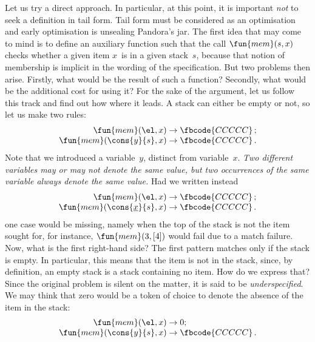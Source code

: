 Let us try a direct approach. In particular, at this point, it is
important \emph{not} to seek a definition in tail form. Tail form must
be considered as an optimisation and early optimisation is unsealing
Pandora's jar. The first idea that may come to mind is to define an
auxiliary function  such that the call \(\fun{mem}(s,x)\)
checks whether a given item \(x\)~is in a given stack~\(s\), because
that notion of membership is implicit in the wording of the
specification. But two problems then arise. Firstly, what would be the
result of such a function? Secondly, what would be the additional cost
for using it? For the sake of the argument, let us follow this track
and find out how where it leads. A stack can either be empty or not,
so let us make two rules:
\begin{equation*}
\begin{array}{r@{\;}c@{\;}l}
\fun{mem}(\el,x) & \rightarrow & \fbcode{CCCCC}\,;\\
\fun{mem}(\cons{y}{s},x) & \rightarrow & \fbcode{CCCCC}\,.
\end{array}
\end{equation*}
Note that we introduced a variable~\(y\), distinct from
variable~\(x\). \emph{Two different variables may or may not denote
  the same value, but two occurrences of the same variable always
  denote the same value.} Had we written instead
\begin{equation*}
\begin{array}{r@{\;}c@{\;}l}
\fun{mem}(\el,x) & \rightarrow & \fbcode{CCCCC}\,;\\
\fun{mem}(\cons{\underline{x}}{s},x) & \rightarrow & \fbcode{CCCCC}\,.
\end{array}
\end{equation*}
one case would be missing, namely when the top of the stack is not the
item sought for, for instance, \(\fun{mem}(3,[4])\) would fail due to
a match failure. Now, what is the first right\hyp{}hand side? The
first pattern matches only if the stack is empty. In particular, this
means that the item is not in the stack, since, by definition, an
empty stack is a stack containing no item. How do we express that?
Since the original problem is silent on the matter, it is said to be
\emph{underspecified}. We may think that
zero would be a token of choice to denote the absence of the item in
the stack:
\begin{equation*}
\begin{array}{r@{\;}c@{\;}l}
\fun{mem}(\el,x) & \rightarrow & 0;\\
\fun{mem}(\cons{y}{s},x) & \rightarrow & \fbcode{CCCCC}\,.
\end{array}
\end{equation*}

